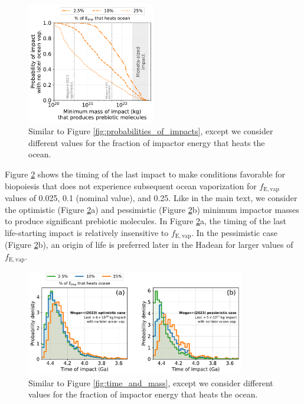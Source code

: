 \documentclass[manuscript]{aastex63}
\begin{document}
\begin{figure}
  \centering
  \includegraphics[width=0.5\textwidth]{figures/probabilities_of_impacts_sens.pdf}
  \caption{Similar to Figure \ref{fig:probabilities_of_impacts}, except we consider different values for the fraction of impactor energy that heats the ocean.}
  \label{fig:probabilities_of_impacts_sens}
\end{figure}

Figure \ref{fig:timing_sensitivity} shows the timing of the last impact to make conditions favorable for biopoiesis that does not experience subsequent ocean vaporization for $f_\mathrm{E,vap}$ values of 0.025, 0.1 (nominal value), and 0.25. Like in the main text, we consider the \citet{Wogan_2023} optimistic (Figure \ref{fig:timing_sensitivity}a) and pessimistic (Figure \ref{fig:timing_sensitivity}b) minimum impactor masses to produce significant prebiotic molecules. In Figure \ref{fig:timing_sensitivity}a, the timing of the last life-starting impact is relatively insensitive to $f_\mathrm{E,vap}$. In the \citet{Wogan_2023} pessimistic case (Figure \ref{fig:timing_sensitivity}b), an origin of life is preferred later in the Hadean for larger values of $f_\mathrm{E,vap}$.

\begin{figure}
  \centering
  \includegraphics[width=0.85\textwidth]{figures/timing_sensitivity.pdf}
  \caption{Similar to Figure \ref{fig:time_and_mass}, except we consider different values for the fraction of impactor energy that heats the ocean.}
  \label{fig:timing_sensitivity}
\end{figure}
\end{document}
